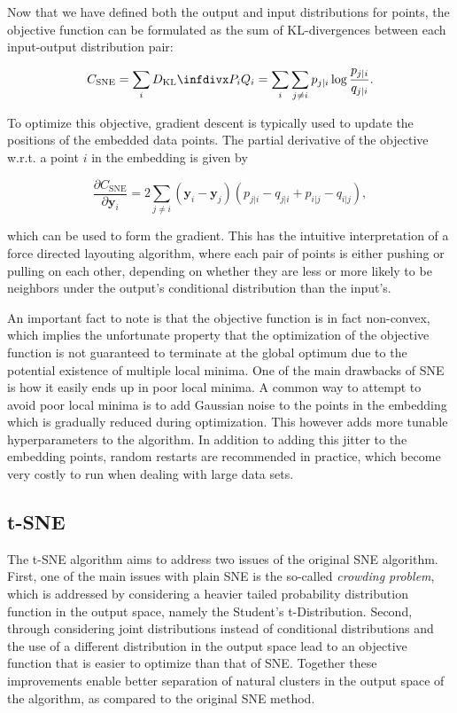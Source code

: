 Now that we have defined both the output and input distributions for points, the objective function can be formulated as the sum of KL-divergences between each input-output distribution pair:

\begin{equation}
C_{\text{SNE}} = \sum_i \dkl{P_i}{Q_i} = \sum_i \sum_{j \neq i} p_{j \vert i} \log \frac{p_{j \vert i}}{q_{j \vert i}}.
\label{eq:c_sne}
\end{equation}

To optimize this objective, gradient descent is typically used to update the positions of the embedded data points. The partial derivative of the objective w.r.t. a point $i$ in the embedding is given by

\begin{equation}
\frac{\partial C_{\text{SNE}}}{\partial \mathbf{y}_i} = 2 \sum_{j \neq i} (\mathbf{y}_i - \mathbf{y}_j)(p_{j \vert i} - q_{j \vert i} + p_{i \vert j} - q_{i \vert j}),
\label{eq:c_sne_grad}
\end{equation}

which can be used to form the gradient. This has the intuitive interpretation of a force directed layouting algorithm, where each pair of points is either pushing or pulling on each other, depending on whether they are less or more likely to be neighbors under the output's conditional distribution than the input's.

An important fact to note is that the objective function is in fact non-convex, which implies the unfortunate property that the optimization of the objective function is not guaranteed to terminate at the global optimum due to the potential existence of multiple local minima. One of the main drawbacks of SNE is how it easily ends up in poor local minima. A common way to attempt to avoid poor local minima is to add Gaussian noise to the points in the embedding which is gradually reduced during optimization. This however adds more tunable hyperparameters to the algorithm. In addition to adding this jitter to the embedding points, random restarts are recommended in practice, which become very costly to run when dealing with large data sets.

\subsection{t-SNE}
\label{subsection:tsne}

The t-SNE algorithm aims to address two issues of the original SNE algorithm. First, one of the main issues with plain SNE is the so-called \textit{crowding problem}, which is addressed by considering a heavier tailed probability distribution function in the output space, namely the Student's t-Distribution. Second, through considering joint distributions instead of conditional distributions and the use of a different distribution in the output space lead to an objective function that is easier to optimize than that of SNE. Together these improvements enable better separation of natural clusters in the output space of the algorithm, as compared to the original SNE method.

